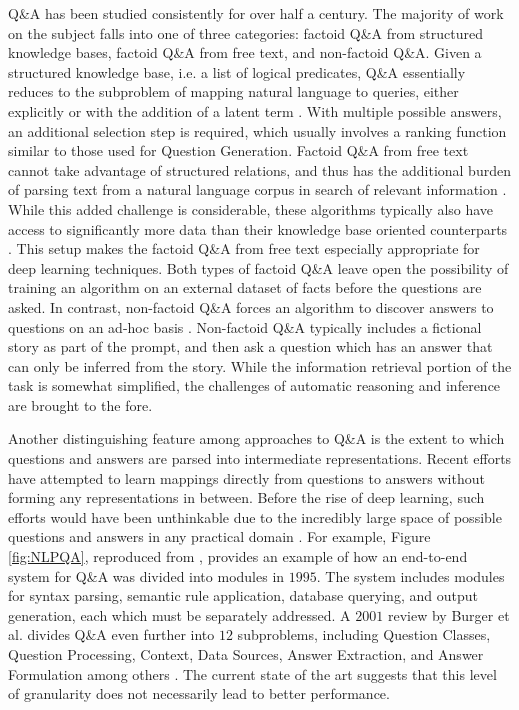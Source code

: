 Q\&A has been studied consistently for over half a century. The majority of work on the subject falls into one of three categories: factoid Q\&A from structured knowledge bases, factoid Q\&A from free text, and non-factoid Q\&A. Given a structured knowledge base, i.e. a list of logical predicates, Q\&A essentially reduces to the subproblem of mapping natural language to queries, either explicitly or with the addition of a latent term  \citep{yao2014information, zelle1996learning}. With multiple possible answers, an additional selection step is required, which usually involves a ranking function similar to those used for Question Generation. Factoid Q\&A from free text cannot take advantage of structured relations, and thus has the additional burden of parsing text from a natural language corpus in search of relevant information  \citep{ravichandran2002learning}. While this added challenge is considerable, these algorithms typically also have access to significantly more data than their knowledge base oriented counterparts  \citep{brill2001data, hermann2015teaching}. This setup makes the factoid Q\&A from free text especially appropriate for deep learning techniques. Both types of factoid Q\&A leave open the possibility of training an algorithm on an external dataset of facts before the questions are asked. In contrast, non-factoid Q\&A forces an algorithm to discover answers to questions on an ad-hoc basis  \citep{soricut2004automatic}. Non-factoid Q\&A typically includes a fictional story as part of the prompt, and then ask a question which has an answer that can only be inferred from the story. While the information retrieval portion of the task is somewhat simplified, the challenges of automatic reasoning and inference are brought to the fore.

Another distinguishing feature among approaches to Q\&A is the extent to which questions and answers are parsed into intermediate representations. Recent efforts have attempted to learn mappings directly from questions to answers without forming any representations in between. Before the rise of deep learning, such efforts would have been unthinkable due to the incredibly large space of possible questions and answers in any practical domain  \citep{hirschman2001natural}. For example, Figure \ref{fig:NLPQA}, reproduced from  \citep{androutsopoulos1995natural}, provides an example of how an end-to-end system for Q\&A was divided into modules in $1995$. The system includes modules for syntax parsing, semantic rule application, database querying, and output generation, each which must be separately addressed. A $2001$ review by Burger et al. divides Q\&A even further into $12$ subproblems, including Question Classes, Question Processing, Context, Data Sources, Answer Extraction, and Answer Formulation among others  \citep{burger2001issues}. The current state of the art suggests that this level of granularity does not necessarily lead to better performance.  

